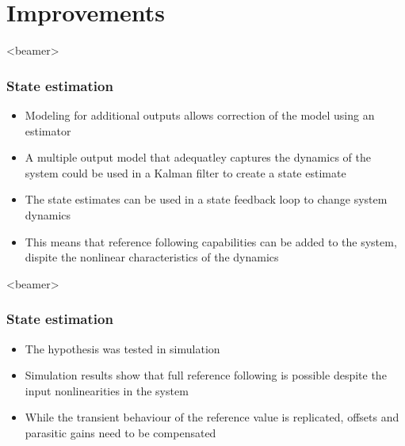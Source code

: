 \section{Improvements}
\begin{frame}<beamer>
\frametitle{State estimation}
  \begin{itemize}
    \item<1-> Modeling for additional outputs allows correction of the model using an estimator
    \item<2->  A multiple output model that adequatley captures the dynamics of the system could be used in a Kalman filter to create a state estimate
    \item<3-> The state estimates can be used in a state feedback loop to change system dynamics
    \item<4-> This means that reference following capabilities can be added to the system, dispite the nonlinear characteristics of the dynamics
  \end{itemize}
\end{frame}

\begin{frame}<beamer>
\frametitle{State estimation}
  \begin{itemize}
    \item<1-> The hypothesis was tested in simulation
    \item<2-> Simulation results show that full reference following is possible despite the input nonlinearities in the system
    \item<3-> While the transient behaviour of the reference value is replicated, offsets and parasitic gains need to be compensated
    \end{itemize}
\end{frame}